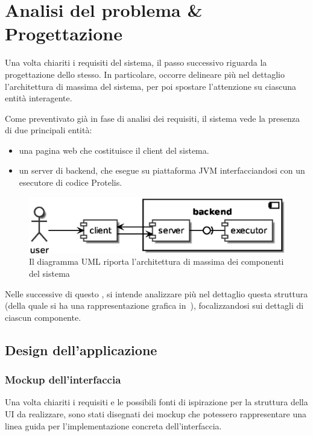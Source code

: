 \chapter{Analisi del problema \& Progettazione}\label{ch:project}
  Una volta chiariti i requisiti del sistema, il passo successivo riguarda la progettazione dello stesso.
  In particolare, occorre delineare più nel dettaglio l'architettura di massima del sistema, per poi spostare l'attenzione su ciascuna entità interagente.

  Come preventivato già in fase di analisi dei requisiti, il sistema vede la presenza di due principali entità:

  \begin{itemize}
    \item una pagina web che costituisce il client del sistema.
    \item un server di backend, che esegue su piattaforma JVM interfacciandosi con un esecutore di codice Protelis.
  \end{itemize}

  \begin{figure}[htbp]
    \centering
    \includegraphics[width=.8\textwidth]{res/uml/architecture-design.eps}%
    \caption{Il diagramma UML riporta l'architettura di massima dei componenti del sistema}%
    \label{fig:architecture-design}
  \end{figure}

  Nelle  successive di questo , si intende analizzare più nel dettaglio questa struttura (della quale si ha una rappresentazione grafica in~),
  focalizzandosi sui dettagli di ciascun componente.

  \section{Design dell'applicazione}\label{sec:client-design}

    \subsection{Mockup dell'interfaccia}\label{subsec:mockup}
      Una volta chiariti i requisiti e le possibili fonti di ispirazione per la struttura della UI da realizzare, sono stati disegnati dei mockup che potessero rappresentare una linea guida
      per l'implementazione concreta dell'interfaccia.

